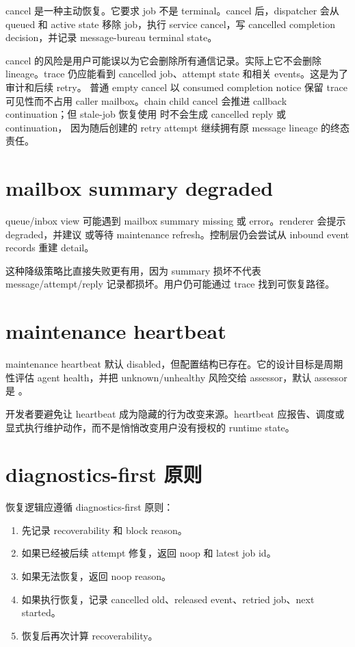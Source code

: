 cancel 是一种主动恢复。它要求 job 不是 terminal。cancel 后，dispatcher 会从 queued 和 active state 移除 job，执行 service cancel，写 cancelled completion decision，并记录 message-bureau terminal state。

cancel 的风险是用户可能误以为它会删除所有通信记录。实际上它不会删除 lineage。trace 仍应能看到 cancelled job、attempt state 和相关 events。这是为了审计和后续 retry。
普通 empty cancel 以 consumed completion notice 保留 trace 可见性而不占用
caller mailbox。chain child cancel 会推进 callback continuation；但 stale-job
恢复使用  时不会生成 cancelled reply 或 continuation，
因为随后创建的 retry attempt 继续拥有原 message lineage 的终态责任。

\section{mailbox summary degraded}

queue/inbox view 可能遇到 mailbox summary missing 或 error。renderer 会提示 degraded，并建议  或等待 maintenance refresh。控制层仍会尝试从 inbound event records 重建 detail。

这种降级策略比直接失败更有用，因为 summary 损坏不代表 message/attempt/reply 记录都损坏。用户仍可能通过 trace 找到可恢复路径。

\section{maintenance heartbeat}

maintenance heartbeat 默认 disabled，但配置结构已存在。它的设计目标是周期性评估 agent health，并把 unknown/unhealthy 风险交给 assessor，默认 assessor 是 。

开发者要避免让 heartbeat 成为隐藏的行为改变来源。heartbeat 应报告、调度或显式执行维护动作，而不是悄悄改变用户没有授权的 runtime state。

\section{diagnostics-first 原则}

恢复逻辑应遵循 diagnostics-first 原则：

\begin{enumerate}
  \item 先记录 recoverability 和 block reason。
  \item 如果已经被后续 attempt 修复，返回 noop 和 latest job id。
  \item 如果无法恢复，返回 noop reason。
  \item 如果执行恢复，记录 cancelled old、released event、retried job、next started。
  \item 恢复后再次计算 recoverability。
\end{enumerate}

